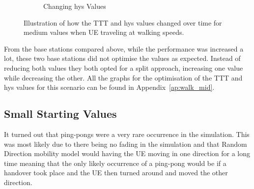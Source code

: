 \begin{figure}[H]
\begin{subfigure}[b]{0.49\textwidth}
                \caption{Changing hys Values}
                \label{fig:walk_mid_hys}
        \end{subfigure}
        \caption{Illustration of how the TTT and hys values changed over time for medium values when UE traveling at walking speeds.}\label{fig:walk_mid_ttthys}
\end{figure}
From the base stations compared above, while the performance was increased a lot, these two base stations did not optimise the values as expected. Instead of reducing both values they both opted for a split approach, increasing one value while decreasing the other. All the graphs for the optimisation of the TTT and hys values for this scenario can be found in Appendix~\ref{ap:walk_mid}.
\subsection{Small Starting Values}\label{sec:walk_low}
It turned out that ping-pongs were a very rare occurrence in the simulation. This was most likely due to there being no fading in the simulation and that Random Direction mobility model would having the UE moving in one direction for a long time meaning that the only likely occurrence of a ping-pong would be if a handover took place and the UE then turned around and moved the other direction.

